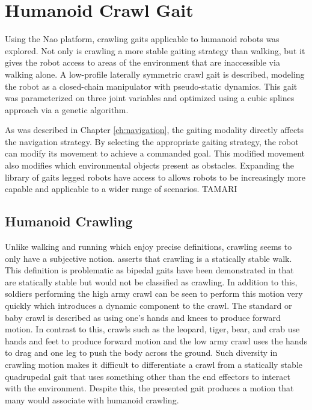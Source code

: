 
\chapter{Humanoid Crawl Gait} \label{ch:crawl_gait}

Using the Nao platform, crawling gaits applicable to humanoid robots was explored. 
Not only is crawling a more stable gaiting strategy than walking, but it gives the robot access to areas
of the environment that are inaccessible via walking alone. A low-profile laterally symmetric crawl gait is described, 
modeling the robot as a closed-chain manipulator with pseudo-static dynamics. This gait was parameterized on 
three joint variables and optimized using a cubic splines approach via a genetic algorithm.

As was described in Chapter \ref{ch:navigation}, the gaiting modality directly affects the navigation strategy.
By selecting the appropriate gaiting strategy, the robot can modify its movement to achieve a commanded goal.
This modified movement also modifies which environmental objects present as obstacles.
Expanding the library of gaits legged robots have access to allows robots to be increasingly more capable
and applicable to a wider range of scenarios.
TAMARI
\section{Humanoid Crawling}

Unlike walking and running which enjoy precise definitions, crawling seems to only have a subjective notion.
\cite{Dudek2000} asserts that crawling is a statically stable walk. This definition is problematic
as bipedal gaits have been demonstrated in \cite{figureoutacitation} that are statically stable but would not
be classified as crawling. In addition to this, soldiers performing the high army crawl \cite{armyfieldmanual2008} can be seen to
perform this motion very quickly which introduces a dynamic component to the crawl.
The standard or baby crawl is described as using one's hands and knees to produce forward motion.
In contrast to this, crawls such as the leopard, tiger, bear, and crab use hands and feet to produce
forward motion and the low army crawl uses the hands to drag and one leg to push the body across the ground.
Such diversity in crawling motion makes it difficult to differentiate a crawl from a statically stable
quadrupedal gait that uses something other than the end effectors to interact with the environment.
Despite this, the presented gait produces a motion that many would associate with humanoid crawling.

